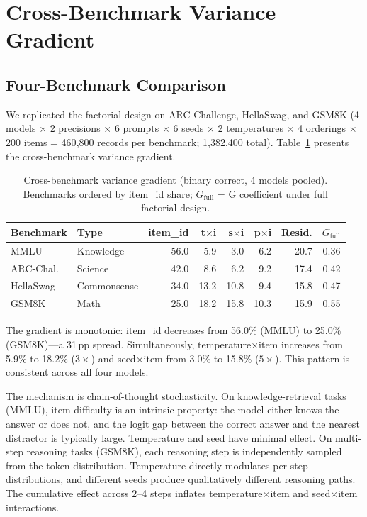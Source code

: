 \documentclass[11pt]{article}
\newcommand{\pp}{\,\text{pp}}
\begin{document}
\section{Cross-Benchmark Variance Gradient}
\label{sec:gradient}

\subsection{Four-Benchmark Comparison}

We replicated the factorial design on ARC-Challenge, HellaSwag, and GSM8K (4 models $\times$ 2 precisions $\times$ 6 prompts $\times$ 6 seeds $\times$ 2 temperatures $\times$ 4 orderings $\times$ 200 items = 460{,}800 records per benchmark; 1{,}382{,}400 total).
Table~\ref{tab:gradient} presents the cross-benchmark variance gradient.

\begin{table}[t]
\centering
\caption{Cross-benchmark variance gradient (binary correct, 4 models pooled). Benchmarks ordered by item\_id share; $G_\text{full}$ = G coefficient under full factorial design.}
\label{tab:gradient}
\small
\begin{tabular}{llrrrrrr}
\toprule
Benchmark & Type & item\_id & t$\times$i & s$\times$i & p$\times$i & Resid. & $G_\text{full}$ \\
\midrule
MMLU & Knowledge & 56.0 & 5.9 & 3.0 & 6.2 & 20.7 & 0.36 \\
ARC-Chal. & Science & 42.0 & 8.6 & 6.2 & 9.2 & 17.4 & 0.42 \\
HellaSwag & Commonsense & 34.0 & 13.2 & 10.8 & 9.4 & 15.8 & 0.47 \\
GSM8K & Math & 25.0 & 18.2 & 15.8 & 10.3 & 15.9 & 0.55 \\
\bottomrule
\end{tabular}
\end{table}

The gradient is monotonic: item\_id decreases from 56.0\% (MMLU) to 25.0\% (GSM8K)---a 31$\pp$ spread. Simultaneously, temperature$\times$item increases from 5.9\% to 18.2\% ($3\times$) and seed$\times$item from 3.0\% to 15.8\% ($5\times$). This pattern is consistent across all four models.

The mechanism is chain-of-thought stochasticity. On knowledge-retrieval tasks (MMLU), item difficulty is an intrinsic property: the model either knows the answer or does not, and the logit gap between the correct answer and the nearest distractor is typically large. Temperature and seed have minimal effect. On multi-step reasoning tasks (GSM8K), each reasoning step is independently sampled from the token distribution. Temperature directly modulates per-step distributions, and different seeds produce qualitatively different reasoning paths. The cumulative effect across 2--4 steps inflates temperature$\times$item and seed$\times$item interactions.
\end{document}
